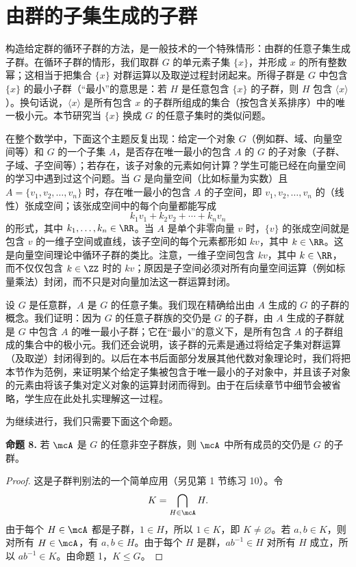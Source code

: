 \section{由群的子集生成的子群}

构造给定群的循环子群的方法，是一般技术的一个特殊情形：由群的任意子集生成子群。在循环子群的情形，我们取群 $G$ 的单元素子集 $\{x\}$，并形成 $x$ 的所有整数幂；这相当于把集合 $\{x\}$ 对群运算以及取逆过程封闭起来。所得子群是 $G$ 中包含 $\{x\}$ 的最小子群（“最小”的意思是：若 $H$ 是任意包含 $\{x\}$ 的子群，则 $H$ 包含 $\langle x\rangle$）。换句话说，$\langle x\rangle$ 是所有包含 $x$ 的子群所组成的集合（按包含关系排序）中的唯一极小元。本节研究当 $\{x\}$ 换成 $G$ 的任意子集时的类似问题。

在整个数学中，下面这个主题反复出现：给定一个对象 $G$（例如群、域、向量空间等）和 $G$ 的一个子集 $A$，是否存在唯一最小的包含 $A$ 的 $G$ 的子对象（子群、子域、子空间等）；若存在，该子对象的元素如何计算？学生可能已经在向量空间的学习中遇到过这个问题。当 $G$ 是向量空间（比如标量为实数）且 $A=\{v_1,v_2,\ldots,v_n\}$ 时，存在唯一最小的包含 $A$ 的子空间，即 $v_1,v_2,\ldots,v_n$ 的（线性）张成空间；该张成空间中的每个向量都能写成
\[
  k_1v_1+k_2v_2+\cdots+k_nv_n
\]
的形式，其中 $k_1,\ldots,k_n\in\RR$。当 $A$ 是单个非零向量 $v$ 时，$\{v\}$ 的张成空间就是包含 $v$ 的一维子空间或直线，该子空间的每个元素都形如 $kv$，其中 $k\in\RR$。这是向量空间理论中循环子群的类比。注意，一维子空间包含 $kv$，其中 $k\in\RR$，而不仅仅包含 $k\in\ZZ$ 时的 $kv$；原因是子空间必须对所有向量空间运算（例如标量乘法）封闭，而不只是对向量加法这一群运算封闭。

设 $G$ 是任意群，$A$ 是 $G$ 的任意子集。我们现在精确给出由 $A$ 生成的 $G$ 的子群的概念。我们证明：因为 $G$ 的任意子群族的交仍是 $G$ 的子群，由 $A$ 生成的子群就是 $G$ 中包含 $A$ 的唯一最小子群；它在“最小”的意义下，是所有包含 $A$ 的子群组成的集合中的极小元。我们还会说明，该子群的元素是通过将给定子集对群运算（及取逆）封闭得到的。以后在本书后面部分发展其他代数对象理论时，我们将把本节作为范例，来证明某个给定子集被包含于唯一最小的子对象中，并且该子对象的元素由将该子集对定义对象的运算封闭而得到。由于在后续章节中细节会被省略，学生应在此处扎实理解这一过程。

为继续进行，我们只需要下面这个命题。

\medskip
\noindent\textbf{命题 8.} 若 $\mcA$ 是 $G$ 的任意非空子群族，则 $\mcA$ 中所有成员的交仍是 $G$ 的子群。

\begin{proof}
这是子群判别法的一个简单应用（另见第 1 节练习 10）。令
\[
  K=\bigcap_{H\in\mcA}H.
\]
由于每个 $H\in\mcA$ 都是子群，$1\in H$，所以 $1\in K$，即 $K\neq\varnothing$。若 $a,b\in K$，则对所有 $H\in\mcA$，有 $a,b\in H$。由于每个 $H$ 是群，$ab^{-1}\in H$ 对所有 $H$ 成立，所以 $ab^{-1}\in K$。由命题 1，$K\leq G$。
\end{proof}

